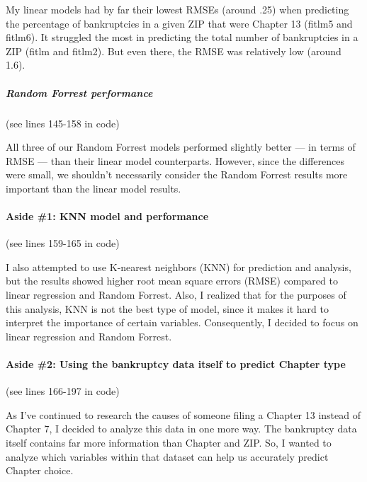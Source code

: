 \documentclass[
]{article}
\begin{document}
My linear models had by far their lowest RMSEs (around .25) when
predicting the percentage of bankruptcies in a given ZIP that were
Chapter 13 (fitlm5 and fitlm6). It struggled the most in predicting the
total number of bankruptcies in a ZIP (fitlm and fitlm2). But even
there, the RMSE was relatively low (around 1.6).

\hypertarget{random-forrest-performance}{%
\subparagraph{Random Forrest
performance}\label{random-forrest-performance}}

(see lines 145-158 in code)

All three of our Random Forrest models performed slightly better --- in
terms of RMSE --- than their linear model counterparts. However, since
the differences were small, we shouldn't necessarily consider the Random
Forrest results more important than the linear model results.

\hypertarget{aside-1-knn-model-and-performance}{%
\paragraph{Aside \#1: KNN model and
performance}\label{aside-1-knn-model-and-performance}}

(see lines 159-165 in code)

I also attempted to use K-nearest neighbors (KNN) for prediction and
analysis, but the results showed higher root mean square errors (RMSE)
compared to linear regression and Random Forrest. Also, I realized that
for the purposes of this analysis, KNN is not the best type of model,
since it makes it hard to interpret the importance of certain variables.
Consequently, I decided to focus on linear regression and Random
Forrest.

\hypertarget{aside-2-using-the-bankruptcy-data-itself-to-predict-chapter-type}{%
\paragraph{Aside \#2: Using the bankruptcy data itself to predict
Chapter
type}\label{aside-2-using-the-bankruptcy-data-itself-to-predict-chapter-type}}

(see lines 166-197 in code)

As I've continued to research the causes of someone filing a Chapter 13
instead of Chapter 7, I decided to analyze this data in one more way.
The bankruptcy data itself contains far more information than Chapter
and ZIP. So, I wanted to analyze which variables within that dataset can
help us accurately predict Chapter choice.
\end{document}
